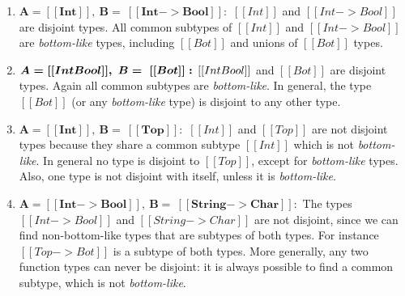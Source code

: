 \begin{enumerate}
  \item $\boldsymbol{A = [[Int]], \ B = \ [[Int -> Bool]]:}$
        $[[Int]]$ and $[[Int -> Bool]]$ are disjoint types. All common subtypes
        of $[[Int]]$ and $[[Int -> Bool]]$ are \emph{bottom-like} types,
        including $[[Bot]]$ and unions of $[[Bot]]$ types.
  \item $\boldsymbol{A = [[Int \/ Bool]], \ B = \ [[Bot]]:}$
    $[[Int \/ Bool]]$ and $[[Bot]]$ are disjoint types. Again all common subtypes are \emph{bottom-like}.
    In general, the type $[[Bot]]$ (or any \emph{bottom-like} type)
    is disjoint to any other type.
  \item $\boldsymbol{A = [[Int]], \ B = \ [[Top]]:}$
        $[[Int]]$ and $[[Top]]$ are not disjoint types because they share a common
    subtype $[[Int]]$ which is not \emph{bottom-like}. In general no type
    is disjoint to $[[Top]]$, except for \emph{bottom-like} types.
    Also, one type is not disjoint with itself, unless it is \emph{bottom-like}.
  \item $\boldsymbol{A = [[Int -> Bool]], \ B = \ [[String -> Char]]:}$
    The types $[[Int -> Bool]]$ and $[[String -> Char]]$ are not disjoint,
    since we can find non-bottom-like types that are subtypes
    of both types. For instance $[[Top -> Bot]]$ is a subtype of both types.
    More generally, any two function types can never be disjoint: it is always
    possible to find a common subtype, which is not \emph{bottom-like}.
\end{enumerate}

\begin{comment}
\begin{figure}[t]
  \begin{small}
    \centering
    \drules[ad]{$[[A * B]]$}{Algorithmic Disjointness}{btmr, btml, intl, intr, orl, orr}
  \end{small}
  \caption{Algorithmic disjointness for \cal.}
  \label{fig:union:ad}
\end{figure}
\end{comment}

